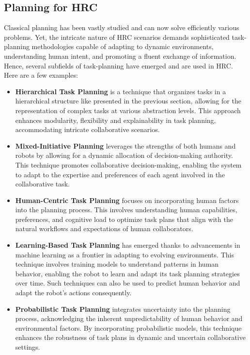 \subsection{Planning for HRC}

Classical planning has been vastly studied and can now solve efficiently various problems. Yet, the intricate nature of HRC scenarios demands sophisticated task-planning methodologies capable of adapting to dynamic environments, understanding human intent, and promoting a fluent exchange of information. Hence, several subfields of task-planning have emerged and are used in HRC. Here are a few examples:

\begin{itemize}
    \item \textbf{Hierarchical Task Planning} is a technique that organizes tasks in a hierarchical structure like presented in the previous section, allowing for the representation of complex tasks at various abstraction levels. This approach enhances modularity, flexibility and explainability in task planning, accommodating intricate collaborative scenarios.
    
    \item \textbf{Mixed-Initiative Planning} leverages the strengths of both humans and robots by allowing for a dynamic allocation of decision-making authority. This technique promotes collaborative decision-making, enabling the system to adapt to the expertise and preferences of each agent involved in the collaborative task.
    
    \item \textbf{Human-Centric Task Planning} focuses on incorporating human factors into the planning process. This involves understanding human capabilities, preferences, and cognitive load to optimize task plans that align with the natural workflows and expectations of human collaborators.
    
    \item \textbf{Learning-Based Task Planning} has emerged thanks to advancements in machine learning as a frontier in adapting to evolving environments. This technique involves training models to understand patterns in human behavior, enabling the robot to learn and adapt its task planning strategies over time. Such techniques can also be used to predict human behavior and adapt the robot's actions consequently.
    
    \item \textbf{Probabilistic Task Planning} integrates uncertainty into the planning process, acknowledging the inherent unpredictability of human behavior and environmental factors. By incorporating probabilistic models, this technique enhances the robustness of task plans in dynamic and uncertain collaborative settings.
\end{itemize}

